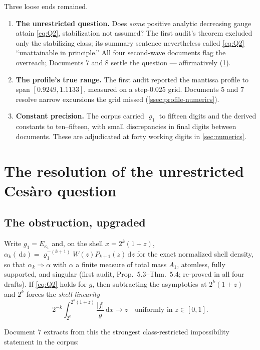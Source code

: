 \documentclass[11pt,oneside]{article}
\theoremstyle{definition}
\theoremstyle{remark}
\newcommand{\dd}{\,\mathrm d}
\begin{document}
Three loose ends remained.
\begin{enumerate}
\item \textbf{The unrestricted question.}  Does \emph{some} positive
analytic decreasing gauge attain \eqref{eq:Q2}, stabilization not
assumed?  The first audit's theorem excluded only the stabilizing
class; its summary sentence nevertheless called \eqref{eq:Q2}
``unattainable in principle.''  All four second-wave documents flag the
overreach; Documents 7 and 8 settle the question --- affirmatively
(\cref{sec:resolution}).
\item \textbf{The profile's true range.}  The first audit reported the
mantissa profile to span $[0.9249,1.1133]$, measured on a step-$0.025$
grid.  Documents 5 and 7 resolve narrow excursions the grid missed
(\cref{ssec:profile-numerics}).
\item \textbf{Constant precision.}  The corpus carried
$\varrho_1$ to fifteen digits and the derived constants to ten--fifteen,
with small discrepancies in final digits between documents.  These are
adjudicated at forty working digits in \cref{sec:numerics}.
\end{enumerate}

\section{The resolution of the unrestricted Ces\`aro question}
\label{sec:resolution}

\subsection{The obstruction, upgraded}
\label{ssec:obstruction}

Write $g_1=E_{\kappa_1}$ and, on the shell $x=2^k(1+z)$,
$\alpha_k(\dd z)=\varrho_1^{-(k+1)}W(z)P_{k+1}(z)\dd z$ for the exact
normalized shell density, so that $\alpha_k\Rightarrow\alpha$ with
$\alpha$ a finite measure of total mass $A_1$, atomless, fully
supported, and singular (first audit, Prop.~5.3--Thm.~5.4; re-proved in
all four drafts).  If \eqref{eq:Q2} holds for $g$, then subtracting the
asymptotics at $2^k(1+z)$ and $2^k$ forces the \emph{shell linearity}
\begin{equation}
 2^{-k}\int_{2^k}^{2^k(1+z)}\frac{|f|}{g}\dd x\longrightarrow z
 \quad\text{uniformly in }z\in[0,1].
 \label{eq:shell-linearity}
\end{equation}

Document 7 extracts from this the strongest class-restricted
impossibility statement in the corpus:
\end{document}
